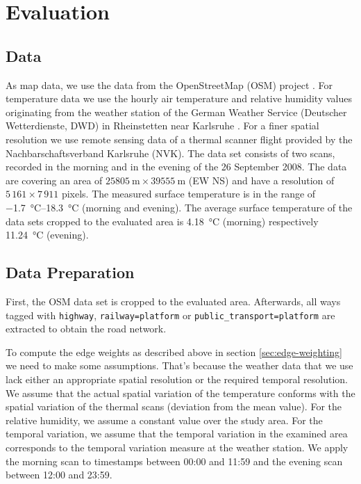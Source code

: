 
\section{Evaluation}

\subsection{Data}
\label{sec:data-sets}
As map data, we use the data from the OpenStreetMap (OSM) project \parencite{OSMF2016}. 
For temperature data we use the hourly air temperature and relative humidity values originating from the weather station of the German Weather Service (Deutscher Wetterdienste, DWD) in Rheinstetten near Karlsruhe \parencite{DWD2016}. For a finer spatial resolution we use remote sensing data of a thermal scanner flight provided by the Nachbarschaftsverband Karlsruhe (NVK). The data set consists of two scans, recorded in the morning and in the evening of the 26 September 2008. The data are covering an area of  $\SI{25 805}{\meter} \times \SI{39 555}{\meter}$ (EW NS) and have a resolution of $5\,161 \times 7\,911$  pixels. The measured surface temperature is in the range of \SIrange{-1.7}{18.3}{\celsius} (morning and evening). The average surface temperature of the data sets cropped to the evaluated area is \SI{4.18}{\celsius} (morning) respectively \SI{11.24}{\celsius} (evening).  


\subsection{Data Preparation}
First, the OSM data set is cropped to the evaluated area. Afterwards, all ways tagged with \verb|highway|, \verb|railway=platform| or \verb|public_transport=platform| are extracted to obtain the road network.

To compute the edge weights as described above in section \ref{sec:edge-weighting} we need to make some assumptions. That's because the weather data that we use lack either an appropriate spatial resolution or the required temporal resolution. We assume that the actual spatial variation of the temperature conforms with the spatial variation of the thermal scans (deviation from the mean value). For the relative humidity, we assume a constant value over the study area. For the temporal variation, we assume that the temporal variation in the examined area corresponds to the temporal variation measure at the weather station. We apply the morning scan to timestamps between  00:00 and 11:59 and the evening scan between 12:00 and 23:59.

